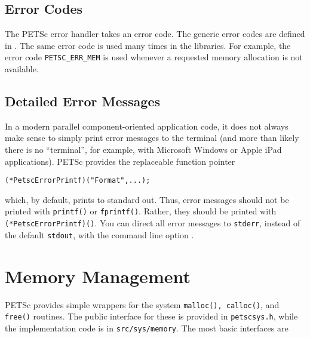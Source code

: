 \subsection{Error Codes}

The PETSc error handler takes an error code.
The generic error codes are defined in
\href{https://www.mcs.anl.gov/petsc/petsc-master/include/petscerror.h.html}{}.
The same error code is used many times in the libraries.
For example, the error code \lstinline{PETSC_ERR_MEM} is used whenever a requested memory allocation is not available.

\subsection{Detailed Error Messages}
In a modern parallel component-oriented application code, it does not always make sense
to simply print error messages to the terminal (and more than likely there is no
``terminal'', for example, with Microsoft Windows or Apple iPad applications).
PETSc provides the replaceable function pointer
\begin{lstlisting}
(*PetscErrorPrintf)("Format",...);
\end{lstlisting}
which, by default, prints to standard out. Thus, error messages should not
be printed with \lstinline{printf()} or \lstinline{fprintf()}.
Rather, they should be printed with
\lstinline{(*PetscErrorPrintf)()}.
You can direct all error messages to \lstinline{stderr}, instead of the default \lstinline{stdout}, with the command line option .

\section{Memory Management}

PETSc provides simple wrappers for the system \lstinline{malloc(), calloc()}, and \lstinline{free()} routines. The public interface for these is provided in \lstinline{petscsys.h}, while the implementation code is in \lstinline{src/sys/memory}. The most basic interfaces are

